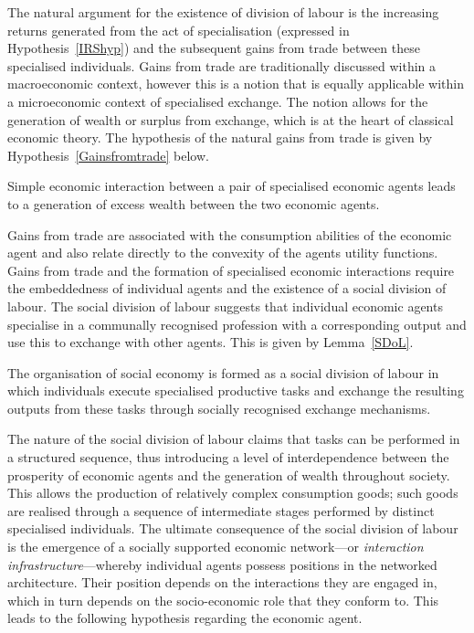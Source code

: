 The natural argument for the existence of division of labour is the increasing returns generated from the act of specialisation (expressed in Hypothesis~\ref{IRShyp}) and the subsequent gains from trade between these specialised individuals. Gains from trade are traditionally discussed within a macroeconomic context, however this is a notion that is equally applicable within a microeconomic context of specialised exchange. The notion allows for the generation of wealth or surplus from exchange, which is at the heart of classical economic theory. The hypothesis of the natural gains from trade is given by Hypothesis~\ref{Gainsfromtrade} below.

\begin{hypothesis} \label{Gainsfromtrade}
Simple economic interaction between a pair of specialised economic agents leads to a generation of excess wealth between the two economic agents.
\end{hypothesis}

Gains from trade are associated with the consumption abilities of the economic agent and also relate directly to the convexity of the agents utility functions. Gains from trade and the formation of specialised economic interactions require the embeddedness of individual agents and the existence of a social division of labour. The social division of labour suggests that individual economic agents specialise in a communally recognised profession with a corresponding output and use this to exchange with other agents. This is given by Lemma~\ref{SDoL}.

\begin{lemma} \label{SDoL}
The organisation of social economy is formed as a social division of labour in which individuals execute specialised productive tasks and exchange the resulting outputs from these tasks through socially recognised exchange mechanisms.
\end{lemma}

The nature of the social division of labour claims that tasks can be performed in a structured sequence, thus introducing a level of interdependence between the prosperity of economic agents and the generation of wealth throughout society. This allows the production of relatively complex consumption goods; such goods are realised through a sequence of intermediate stages performed by distinct specialised individuals. The ultimate consequence of the social division of labour is the emergence of a socially supported economic network---or \emph{interaction infrastructure}---whereby individual agents possess positions in the networked architecture. Their position depends on the interactions they are engaged in, which in turn depends on the socio-economic role that they conform to. This leads to the following hypothesis regarding the economic agent.

